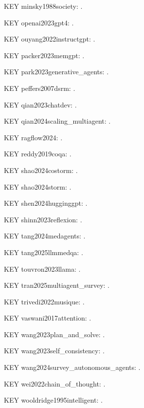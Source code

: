 \documentclass[a4paper,fleqn]{cas-dc}
\begin{document}
\noindent KEY minsky1988society: \citep{minsky1988society}.\par
\noindent KEY openai2023gpt4: \citep{openai2023gpt4}.\par
\noindent KEY ouyang2022instructgpt: \citep{ouyang2022instructgpt}.\par
\noindent KEY packer2023memgpt: \citep{packer2023memgpt}.\par
\noindent KEY park2023generative\_agents: \citep{park2023generative_agents}.\par
\noindent KEY peffers2007dsrm: \citep{peffers2007dsrm}.\par
\noindent KEY qian2023chatdev: \citep{qian2023chatdev}.\par
\noindent KEY qian2024scaling\_multiagent: \citep{qian2024scaling_multiagent}.\par
\noindent KEY ragflow2024: \citep{ragflow2024}.\par
\noindent KEY reddy2019coqa: \citep{reddy2019coqa}.\par
\noindent KEY shao2024costorm: \citep{shao2024costorm}.\par
\noindent KEY shao2024storm: \citep{shao2024storm}.\par
\noindent KEY shen2024hugginggpt: \citep{shen2024hugginggpt}.\par
\noindent KEY shinn2023reflexion: \citep{shinn2023reflexion}.\par
\noindent KEY tang2024medagents: \citep{tang2024medagents}.\par
\noindent KEY tang2025llmmedqa: \citep{tang2025llmmedqa}.\par
\noindent KEY touvron2023llama: \citep{touvron2023llama}.\par
\noindent KEY tran2025multiagent\_survey: \citep{tran2025multiagent_survey}.\par
\noindent KEY trivedi2022musique: \citep{trivedi2022musique}.\par
\noindent KEY vaswani2017attention: \citep{vaswani2017attention}.\par
\noindent KEY wang2023plan\_and\_solve: \citep{wang2023plan_and_solve}.\par
\noindent KEY wang2023self\_consistency: \citep{wang2023self_consistency}.\par
\noindent KEY wang2024survey\_autonomous\_agents: \citep{wang2024survey_autonomous_agents}.\par
\noindent KEY wei2022chain\_of\_thought: \citep{wei2022chain_of_thought}.\par
\noindent KEY wooldridge1995intelligent: \citep{wooldridge1995intelligent}.\par
\end{document}

